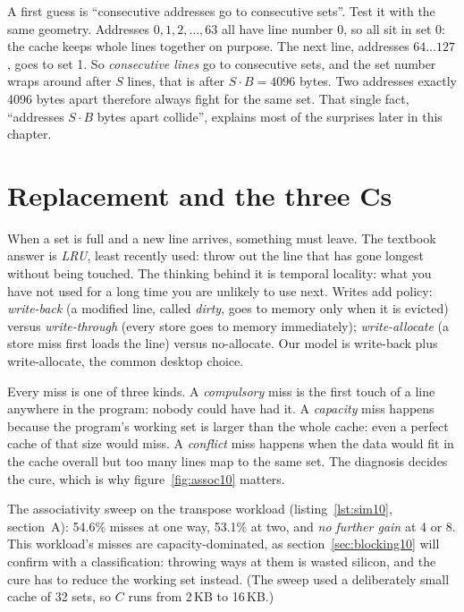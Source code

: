 \begin{example}
A first guess is ``consecutive addresses go to consecutive sets''. Test
it with the same geometry. Addresses \(0, 1, 2, \ldots, 63\) all have
line number 0, so all sit in set 0: the cache keeps whole lines together
on purpose. The next line, addresses \(64\ldots127\), goes to set 1.
So \emph{consecutive lines} go to consecutive sets, and the set number
wraps around after \(S\) lines, that is after \(S\cdot B=4096\) bytes.
Two addresses exactly 4096 bytes apart therefore always fight for the
same set. That single fact, ``addresses \(S\cdot B\) bytes apart
collide'', explains most of the surprises later in this chapter.
\end{example}

\section{Replacement and the three Cs}
\label{sec:threecs10}

When a set is full and a new line arrives, something must leave. The
textbook answer is \emph{LRU}, least recently used: throw out the line
that has gone longest without being touched. The thinking behind it is
temporal locality: what you have not used for a long time you are
unlikely to use next. Writes add policy: \emph{write-back} (a modified
line, called \emph{dirty}, goes to memory only when it is evicted) versus
\emph{write-through} (every store goes to memory immediately);
\emph{write-allocate} (a store miss first loads the line) versus
no-allocate. Our model is write-back plus write-allocate, the common
desktop choice.



Every miss is one of three kinds. A \emph{compulsory} miss is the first
touch of a line anywhere in the program: nobody could have had it. A
\emph{capacity} miss happens because the program's working set is
larger than the whole cache: even a perfect cache of that size
would miss. A \emph{conflict} miss happens when the data would fit in
the cache overall but too many lines map to the same set. The diagnosis
decides the cure, which is why figure~\ref{fig:assoc10} matters.



\begin{example}
The associativity sweep on the transpose workload (listing~\ref{lst:sim10},
section~A): 54.6\% misses at one way, 53.1\% at two, and \emph{no further
gain} at 4 or 8. This workload's misses are capacity-dominated, as
section~\ref{sec:blocking10} will confirm with a classification: throwing
ways at them is wasted silicon, and the cure has to reduce the working
set instead. (The sweep used a deliberately small cache of 32 sets,
so \(C\) runs from 2\,KB to 16\,KB.)
\end{example}

